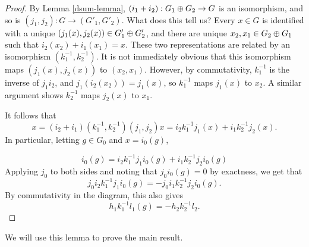 \begin{proof}
By Lemma \ref{dsum-lemma}, $(i_1+i_2):G_1\oplus G_2\rightarrow G$ is an isomorphism, and so is $(j_1,j_2):G\rightarrow(G'_1,G'_2)$. What does this tell us? Every $x\in G$ is identified with a unique $(j_1(x),j_2(x))\in G_1'\oplus G_2'$, and there are unique $x_2,x_1\in G_2\oplus G_1$ such that $i_2(x_2)+i_1(x_1)=x$. These two representations are related by an isomorphism $(k_1^{-1},k_2^{-1})$. It is not immediately obvious that this isomorphism maps $(j_1(x),j_2(x))$ to $(x_2,x_1)$. However, by commutativity, $k_1^{-1}$ is the inverse of $j_1i_2$, and $j_1(i_2(x_2))=j_1(x)$, so $k_1^{-1}$ maps $j_1(x)$ to $x_2$. A similar argument shows $k_2^{-1}$ maps $j_2(x)$ to $x_1$.

It follows that $$x=(i_2+i_1)(k_1^{-1},k_2^{-1})(j_1,j_2)x=i_2k_1^{-1}j_1(x)+i_1k_2^{-1}j_2(x).$$ In particular, letting $g\in G_0$ and $x=i_0(g)$, 

$$i_0(g)=i_2k_1^{-1}j_1i_0(g)+i_1k_2^{-1}j_2i_0(g)$$
Applying $j_0$ to both sides and noting that $j_0i_0(g)=0$ by exactness, we get that 
$$j_0i_2k_1^{-1}j_1i_0(g)=-j_0i_1k_2^{-1}j_2i_0(g).$$
By commutativity in the diagram, this also gives
$$h_1k_1^{-1}l_1(g)=-h_2k_2^{-1}l_2.$$
\cite{Eilenberg}
\end{proof}

We will use this lemma to prove the main result.

